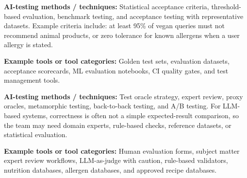\documentclass[
  letterpaper,
  DIV=11,
  numbers=noendperiod,
  oneside]{scrreprt}
\begin{document}
\begin{tcolorbox}[enhanced jigsaw, arc=.35mm, bottomrule=.15mm, bottomtitle=1mm, breakable, colback=white, colbacktitle=quarto-callout-tip-color!10!white, colframe=quarto-callout-tip-color-frame, coltitle=black, left=2mm, leftrule=.75mm, opacityback=0, opacitybacktitle=0.6, rightrule=.15mm, title=\textcolor{quarto-callout-tip-color}{\faLightbulb}\hspace{0.5em}{What are the acceptance criteria for good enough recommendations?}, titlerule=0mm, toprule=.15mm, toptitle=1mm]

\textbf{AI-testing methods / techniques:} Statistical acceptance
criteria, threshold-based evaluation, benchmark testing, and acceptance
testing with representative datasets. Example criteria include: at least
95\% of vegan queries must not recommend animal products, or zero
tolerance for known allergens when a user allergy is stated.

\textbf{Example tools or tool categories:} Golden test sets, evaluation
datasets, acceptance scorecards, ML evaluation notebooks, CI quality
gates, and test management tools.

\end{tcolorbox}

\begin{tcolorbox}[enhanced jigsaw, arc=.35mm, bottomrule=.15mm, bottomtitle=1mm, breakable, colback=white, colbacktitle=quarto-callout-tip-color!10!white, colframe=quarto-callout-tip-color-frame, coltitle=black, left=2mm, leftrule=.75mm, opacityback=0, opacitybacktitle=0.6, rightrule=.15mm, title=\textcolor{quarto-callout-tip-color}{\faLightbulb}\hspace{0.5em}{How do we decide whether an LLM answer is correct or acceptable?}, titlerule=0mm, toprule=.15mm, toptitle=1mm]

\textbf{AI-testing methods / techniques:} Test oracle strategy, expert
review, proxy oracles, metamorphic testing, back-to-back testing, and
A/B testing. For LLM-based systems, correctness is often not a simple
expected-result comparison, so the team may need domain experts,
rule-based checks, reference datasets, or statistical evaluation.

\textbf{Example tools or tool categories:} Human evaluation forms,
subject matter expert review workflows, LLM-as-judge with caution,
rule-based validators, nutrition databases, allergen databases, and
approved recipe databases.

\end{tcolorbox}
\end{document}
